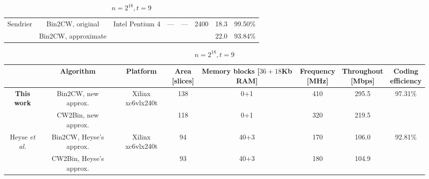 \documentclass[10pt,journal,compsoc]{IEEEtran}
\begin{document}
\begin{table}[!htb]
\begin{subtable}[t]{0.95\linewidth}
\begin{tabular}{cccccccc}
    \hline
    \multirow{2}{*}{Sendrier\cite{sendrier2005encoding}} & Bin2CW, original & \multirow{2}{*}{Intel Pentium 4} &\multirow{2}{*}{---}  & \multirow{2}{*}{---} & \multirow{2}{*}{2400} &18.3 &99.50\%\\
                                        & Bin2CW, approximate & &  &  &  &22.0 & 93.84\%\\

    \hline
    \end{tabular}
\end{subtable}
\vspace{1.5em}

\begin{subtable}[t]{0.95\linewidth}\centering
    \caption{$n=2^{18}, t=9$}
    \begin{tabular}{cccccccc}\hline
    &   Algorithm & Platform & \tabincell{c}{Area\\{}[slices]} & \tabincell{c}{Memory blocks\\{}[$36+18$Kb RAM]} & \tabincell{c}{Frequency\\{}[MHz]} & \tabincell{c}{Throughout\\{}[Mbps]} & \tabincell{c}{Coding\\efficiency}\\
    \hline
    \multirow{2}{*}{\textbf{This work}} & Bin2CW, new approx. & \multirow{2}{*}{Xilinx xc6vlx240t} & 138 & 0+1 & 410 & 295.5 &\multirow{2}{*}{97.31\%}\\
                                        & CW2Bin, new approx. &  & 118 & 0+1 & 320 & 219.5 &\\

    \hline
    \multirow{2}{*}{Heyse \textit{et al.}\cite{heyse2012towards}} & Bin2CW, Heyse's approx. & \multirow{2}{*}{Xilinx xc6vlx240t} & 94 & 40+3 & 170& 106.0&\multirow{2}{*}{92.81\%} \\
                                        & CW2Bin, Heyse's approx. & & 93 & 40+3 & 180 &104.9& \\

    \hline
    \end{tabular}
\end{subtable}
\vspace{1.5em}


\end{table}
\end{document}
